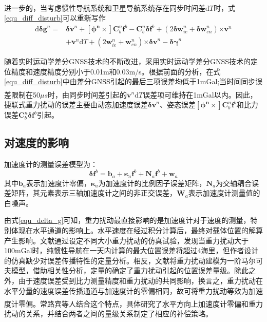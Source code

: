 \documentclass[12pt,a4,utf8]{article}
\newcommand{\upcite}[1]{\textsuperscript{\textsuperscript{\cite{#1}}}} %
\begin{document}
进一步的，当考虑惯性导航系统和卫星导航系统存在同步时间差$\text{d}T$时\upcite{schwarz1995some}，式\ref{equ_diff_disturb}可以重新写作
\begin{equation}
      \begin{aligned}
      \text{d}\bm{\delta g}^n = &\bm{\delta} \dot{\bm{v}}^n + \bm{[\phi^n\times]}\bm{C}^n_b \bm{f}^b - \bm{C}^n_b \bm{\delta f}^b + (2\bm{\delta w}^n_{ie} + \bm{\delta w}^n_{en})\bm{\times v}^n
      \\
      &+\ddot{\bm{v}}^n\text{d}T+(2\bm{w}^n_{ie} + \bm{w}^n_{en})\bm{\times \delta v}^n - \bm{\delta \gamma}^n
      \end{aligned}
      \label{equ_diff_disturb_more}
\end{equation}

随着实时运动学差分GNSS技术的不断改进，采用实时运动学差分GNSS技术的定位精度和速度精度分别小于0.01m和0.03m/s。根据前面的分析，在式\ref{equ_diff_disturb}中由差分GNSS引起的最后三项误差均低于1mGal;当时间同步误差限制在50$\mu s$时，由同步时间差引起的$\ddot{\bm{v}}^n\text{d}T$误差项可维持在1mGal以内\upcite{hao2024methods}。因此，捷联式重力扰动的误差主要由动态加速度误差$\bm{\delta} \dot{\bm{v}}^n$、姿态误差$\bm{[\phi^n\times]}\bm{C}^n_b \bm{f}^b$和比力误差$\bm{C}^n_b \bm{\delta f}^b$引起。

\subsection{对速度的影响}
加速度计的测量误差模型为：
\begin{equation}
      \bm{\delta f}^b = \bm{b}_a + \bm{\kappa}_a \bm{f}^b + \bm{\text{N}}_a \bm{f}^b + \bm{w}_a
      \label{acc_bias}
\end{equation}
其中$\bm{b}_a$表示加速度计零偏，$\bm{\kappa}_a$为加速度计的比例因子误差矩阵，$\bm{\text{N}}_a$为交轴耦合误差矩阵，其元素表示三轴加速度计之间的非正交误差，$\bm{W}_a$表示加速度计测量值的白噪声。

由式\ref{equ_delta_g}可知，重力扰动最直接影响的是加速度计对于速度的测量，特别体现在水平通道的影响上。水平速度在经过积分计算后，最终对载体位置的解算产生影响。文献\cite{gao2021real}通过设定不同大小重力扰动的仿真试验，发现当重力扰动大于100mGal时，纯惯性导航在一天内计算的最大位置误差将超过4海里，但作者设计的仿真缺少对误差传播特性的定量分析。相反，文献\cite{WANGJING2016}将重力扰动建模为一阶马尔可夫模型，借助相关性分析，定量的确定了重力扰动引起的位置误差量级。除此之外，由于速度误差受到比力测量精度和重力扰动的共同影响，换言之，重力扰动在水平分量的速度误差传播通道与加速度计的零偏相同，故可将重力扰动等效为加速度计零偏。常路宾等人结合这个特点\upcite{chang2018gravity}，具体研究了水平方向上加速度计零偏和重力扰动的关系，并结合两者之间的量级关系制定了相应的补偿策略。
\end{document}
